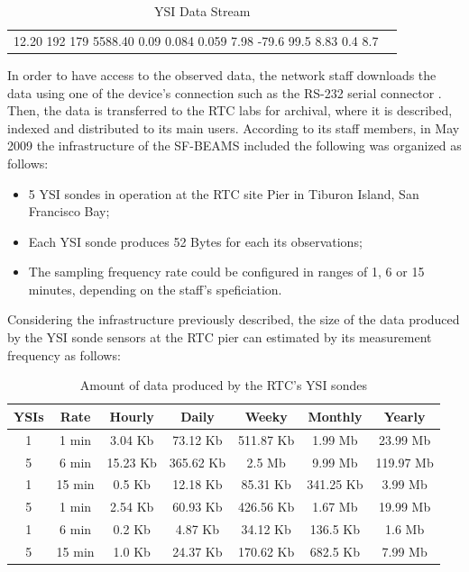 \begin{table}
    \caption{YSI Data Stream}
    \begin{center}
        \begin{tabular}{lr}
  12.20    192    179 5588.40   0.09   0.084   0.059  7.98   -79.6   99.5  8.83 
  0.4     8.7
        \end{tabular}
    \end{center}
    \label{tab:ysi-data-stream}
\end{table}

In order to have access to the observed data, the network staff downloads
the data using one of the device's connection such as the RS-232 serial
connector \cite{rs232}. Then, the data is transferred to the RTC labs for
archival, where it is described, indexed and distributed to its main users.
According to its staff members, in May 2009 the infrastructure of the SF-BEAMS
included the following was organized as follows:

\begin{itemize}
  \item 5 YSI sondes in operation at the RTC site Pier in Tiburon Island, San
  Francisco Bay;
  \item Each YSI sonde produces 52 Bytes for each its observations;
  \item The sampling frequency rate could be configured in ranges of 1, 6 or
  15 minutes, depending on the staff's speficiation. 
\end{itemize}

Considering the infrastructure previously described, the size of the data
produced by the YSI sonde sensors at the RTC pier can estimated by its
measurement frequency as follows:

\begin{table}
    \label{tab:ysi-data-distribution}
    \caption{Amount of data produced by the RTC's YSI sondes}
        \begin{center}
        \begin{tabular}{|c|c|c|c|c|c|c|}\hline 
        \textbf{YSIs} & \textbf{Rate} & \textbf{Hourly} & \textbf{Daily} &
        \textbf{Weeky} & \textbf{Monthly} & \textbf{Yearly}\\\hline 
        1 & 1 min & 3.04 Kb & 73.12 Kb & 511.87 Kb & 1.99 Mb & 23.99 Mb\\\hline 
        5 & 6 min & 15.23 Kb & 365.62 Kb & 2.5 Mb & 9.99 Mb & 119.97 Mb\\\hline 
        1 & 15 min & 0.5 Kb & 12.18 Kb & 85.31 Kb & 341.25 Kb & 3.99 Mb\\\hline 
        5 & 1 min & 2.54 Kb & 60.93 Kb & 426.56 Kb & 1.67 Mb & 19.99 Mb\\\hline
        1 & 6 min & 0.2 Kb & 4.87 Kb & 34.12 Kb & 136.5 Kb & 1.6 Mb\\\hline 
        5 & 15 min & 1.0 Kb & 24.37 Kb & 170.62 Kb & 682.5 Kb & 7.99 Mb\\\hline
        \end{tabular}
        \end{center}
\end{table}

